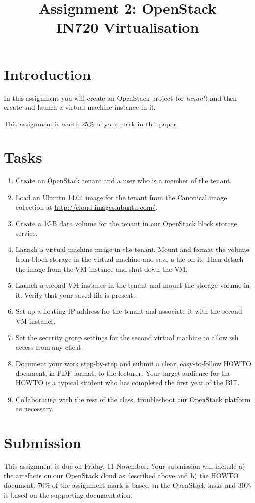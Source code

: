 \documentclass{article}
\begin{document}
\title{Assignment 2: OpenStack \\ IN720 Virtualisation}
\date{}
\maketitle

\section*{Introduction}
In this assignment you will create an OpenStack project (or \emph{tenant}) and then create and launch a virtual machine instance in it.

This assignment is worth 25\% of your mark in this paper.

\section{Tasks}

\begin{enumerate}
	\item Create an OpenStack tenant and a user who is a member of the tenant.
	\item Load an Ubuntu 14.04 image for the tenant from the Canonical image collection at \url{http://cloud-images.ubuntu.com/}.
	\item Create a 1GB data volume for the tenant in our OpenStack block storage service.
	\item Launch a virtual machine image in the tenant.  Mount and format the volume from block storage in the virtual machine 
	and save a file on it.  Then detach the image from the VM instance and shut down the VM.
	\item Launch a second VM instance in the tenant and mount the storage volume in it.  Verify that your saved file is present.
	\item Set up a floating IP address for the tenant and associate it with the second VM instance.
	\item Set the security group settings for the second virtual machine to allow ssh access from any client.
	\item Document your work step-by-step and submit a clear, easy-to-follow HOWTO document, in PDF format, to the lecturer.  Your target audience for the HOWTO is a typical student who has completed the first year of the BIT.
	\item Collaborating with the rest of the class, troubleshoot our OpenStack platform as necessary.
\end{enumerate}

\section{Submission}
This assignment is due on Friday, 11 November. Your submission will include a) the artefacts on our OpenStack cloud as described above and b) the HOWTO 
document.  70\% of the assignment mark is based on the OpenStack tasks and 30\% is based on the supporting documentation. 
\end{document}
